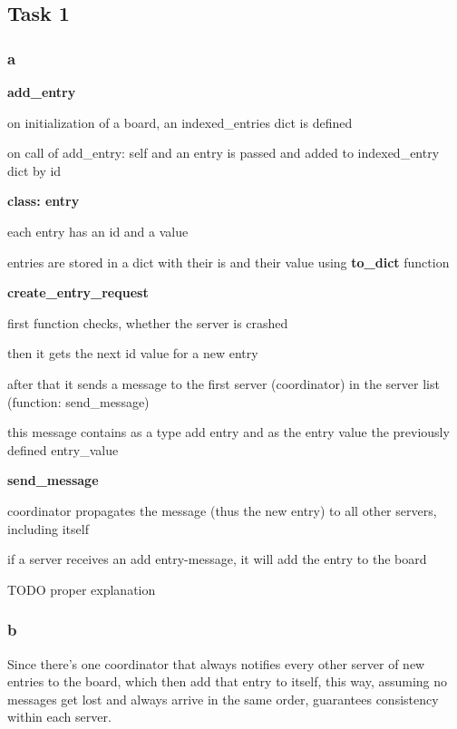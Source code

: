 \documentclass[a4paper, 12pt]{article}
\begin{document}
\subsection*{Task 1}
\subsubsection*{a}
\textbf{add\_entry}
\begin{compactitem}
    \item on initialization of a board, an indexed\_entries dict is defined
    \item on call of add\_entry: self and an entry is passed and added to indexed\_entry dict by id
\end{compactitem}
\textbf{class: entry}
\begin{compactitem}
    \item each entry has an id and a value
    \item entries are stored in a dict with their is and their value using \textbf{to\_dict} function
\end{compactitem}
\textbf{create\_entry\_request}
\begin{compactitem}
    \item first function checks, whether the server is crashed
    \item then it gets the next id value for a new entry
    \item after that it sends a message to the first server (coordinator) in the server list (function: send\_message)
    \item this message contains as a type add entry and as the entry value the previously defined entry\_value
\end{compactitem}
\textbf{send\_message}
\begin{compactitem}
    \item coordinator propagates the message (thus the new entry) to all other servers, including itself
    \item if a server receives an add entry-message, it will add the entry to the board
\end{compactitem}
TODO proper explanation

\subsubsection*{b}
Since there's one coordinator that always notifies every other server of new entries 
to the board, which then add that entry to itself, this way, assuming no messages get 
lost and always arrive in the same order, guarantees consistency within each server.
\end{document}
